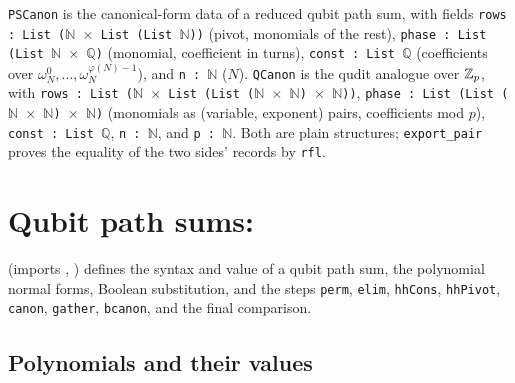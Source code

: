 \begin{definition}\label{def:lean-pathsum-canon}
\textnormal{\texttt{PSCanon}} is the canonical-form data of a reduced qubit path sum, with fields
\textnormal{\texttt{rows : List (\allowbreak{}\ensuremath{\mathbb{N}} \ensuremath{\times} List (\allowbreak{}List \ensuremath{\mathbb{N}}))}} (pivot, monomials of the rest),
\textnormal{\texttt{phase : List (\allowbreak{}List \ensuremath{\mathbb{N}} \ensuremath{\times} \ensuremath{\mathbb{Q}})}} (monomial, coefficient in turns),
\textnormal{\texttt{const : List \ensuremath{\mathbb{Q}}}} (coefficients over $\omega_N^0,\dots,\omega_N^{\varphi(N)-1}$), and
\textnormal{\texttt{n : \ensuremath{\mathbb{N}}}} ($N$). \textnormal{\texttt{QCanon}} is the qudit analogue over $\mathbb{Z}_{p}$, with
\textnormal{\texttt{rows : List (\allowbreak{}\ensuremath{\mathbb{N}} \ensuremath{\times} List (\allowbreak{}List (\allowbreak{}\ensuremath{\mathbb{N}} \ensuremath{\times} \ensuremath{\mathbb{N}}) \ensuremath{\times} \ensuremath{\mathbb{N}}))}}, \textnormal{\texttt{phase : List (\allowbreak{}List (\allowbreak{}\ensuremath{\mathbb{N}} \ensuremath{\times} \ensuremath{\mathbb{N}}) \ensuremath{\times} \ensuremath{\mathbb{N}})}}
(monomials as (variable, exponent) pairs, coefficients mod $p$), \textnormal{\texttt{const : List \ensuremath{\mathbb{Q}}}},
\textnormal{\texttt{n : \ensuremath{\mathbb{N}}}}, and \textnormal{\texttt{p : \ensuremath{\mathbb{N}}}}. Both are plain structures; \textnormal{\texttt{export\_\allowbreak{}pair}} proves the equality of
the two sides' records by \textnormal{\texttt{rfl}}.
\end{definition}

\section{Qubit path sums: \texorpdfstring{}{PathSumSem}}\label{sec:lean-pathsum-sem}

 (imports , ) defines the syntax and value of a qubit path
sum, the polynomial normal forms, Boolean substitution, and the steps \textnormal{\texttt{perm}}, \textnormal{\texttt{elim}},
\textnormal{\texttt{hhCons}}, \textnormal{\texttt{hhPivot}}, \textnormal{\texttt{canon}}, \textnormal{\texttt{gather}}, \textnormal{\texttt{bcanon}}, and the final
comparison.

\subsection{Polynomials and their values}

